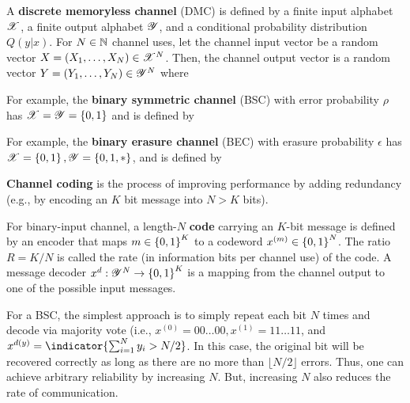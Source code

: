 \documentclass[letterpaper,10pt,english]{article}
\begin{document}
\begin{defn}
A \textbf{discrete memoryless channel} (DMC) is defined by a finite input alphabet $\mathscr{X}$, 
a finite output alphabet $\mathscr{Y}$, and a conditional probability distribution $Q(y|x)$. 
For $N \in \mathbb{N}$ channel uses, let the channel input vector be a random vector $X = (X_1, \dots, X_N) \in \mathscr{X}^N$. 
Then, the channel output vector is a random vector $Y = (Y_1, \dots,Y_N) \in \mathscr{Y}^N$ where 
\end{defn} 
\begin{shaded*}\begin{exmp}
For example, the \textbf{binary symmetric channel} (BSC) with error probability $\rho$ has $\mathscr{X} = \mathscr{Y} = \left\{0, 1\right\}$ and is defined by
\end{exmp}\end{shaded*} 
\begin{shaded*}\begin{exmp}
 For example, the \textbf{binary erasure channel} (BEC) with erasure probability $\epsilon$ has $\mathscr{X} = \left\{0,1\right\}, \mathscr{Y} =  \left\{0,1,\ast\right\}$, and is defined by 

\textbf{Channel coding} is the process of improving performance by adding redundancy (e.g., by encoding an $K$ bit message into $N > K$ bits).
\end{exmp}\end{shaded*} 
\begin{defn} 
For binary-input channel, a length-$N$ \textbf{code} carrying an $K$-bit message is defined by an encoder that maps $m \in \left\{0,1\right\}^K$ to a codeword $x^{(m)} \in \left\{0,1\right\}^N$. 
The ratio $R = K/N$ is called the rate (in information bits per channel use) of the code. 
A message decoder $x^d : \mathscr{Y}^N \to \left\{0,1\right\}^K$ is a mapping from the channel output to one of the possible input messages.
\end{defn} 
\begin{shaded*}\begin{exmp}
For a BSC, the simplest approach is to simply repeat each bit $N$ times and decode via majority vote (i.e., $x^{(0)} = 00 \dots 00, x^{(1)} = 11 \dots 11$, and $x^{d(y)} =\indicator{\sum_{i=1}^Ny_i > N/2}$. 
In this case, the original bit will be recovered correctly as long as there are no more than $\lfloor N/2\rfloor$ errors. 
Thus, one can achieve arbitrary reliability by increasing $N$. 
But, increasing $N$ also reduces the rate of communication.
\end{exmp}\end{shaded*} 
\end{document}
